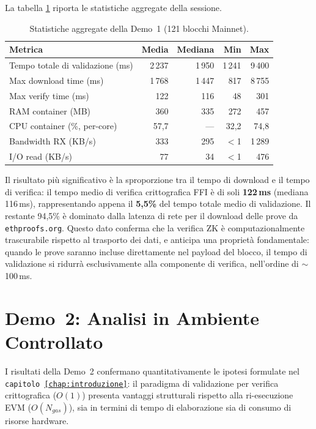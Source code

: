 \documentclass[12pt,a4paper,openright,twoside]{report}
\begin{document}
La tabella \ref{tab:demo1_summary} riporta le statistiche aggregate della sessione.
\\
\begin{table}[H]
\centering
\begin{tabular}{l r r r r}
\hline
\textbf{Metrica} & \textbf{Media} & \textbf{Mediana} & \textbf{Min} & \textbf{Max} \\
\hline
Tempo totale di validazione (ms) & 2\,237 & 1\,950 & 1\,241 & 9\,400 \\
Max download time (ms)           & 1\,768 & 1\,447 & 817   & 8\,755 \\
Max verify time (ms)             & 122   & 116   & 48    & 301 \\
\hline
RAM container (MB)               & 360   & 335   & 272   & 457 \\
CPU container (\%, per-core)     & 57,7  & ---   & 32,2  & 74,8 \\
Bandwidth RX (KB/s)              & 333   & 295   & $<$1  & 1\,289 \\
I/O read (KB/s)                  & 77    & 34    & $<$1  & 476 \\
\hline
\end{tabular}
\caption{Statistiche aggregate della Demo~1 (121 blocchi Mainnet).}
\label{tab:demo1_summary}
\end{table}

Il risultato più significativo è la sproporzione tra il tempo di download e il tempo di verifica: il tempo medio di verifica crittografica FFI è di soli \textbf{122\,ms} (mediana 116\,ms), rappresentando appena il \textbf{5,5\%} del tempo totale medio di validazione. Il restante 94,5\% è dominato dalla latenza di rete per il download delle prove da \texttt{ethproofs.org}. Questo dato conferma che la verifica ZK è computazionalmente trascurabile rispetto al trasporto dei dati, e anticipa una proprietà fondamentale: quando le prove saranno incluse direttamente nel payload del blocco, il tempo di validazione si ridurrà esclusivamente alla componente di verifica, nell'ordine di $\sim$100\,ms.


\section{Demo~2: Analisi in Ambiente Controllato}\label{sec:demo2_risultati}

I risultati della Demo~2 confermano quantitativamente le ipotesi formulate nel \texttt{capitolo \ref{chap:introduzione}}: il paradigma di validazione per verifica crittografica ($O(1)$) presenta vantaggi strutturali rispetto alla ri-esecuzione EVM ($O(N_{gas})$), sia in termini di tempo di elaborazione sia di consumo di risorse hardware.
\end{document}
